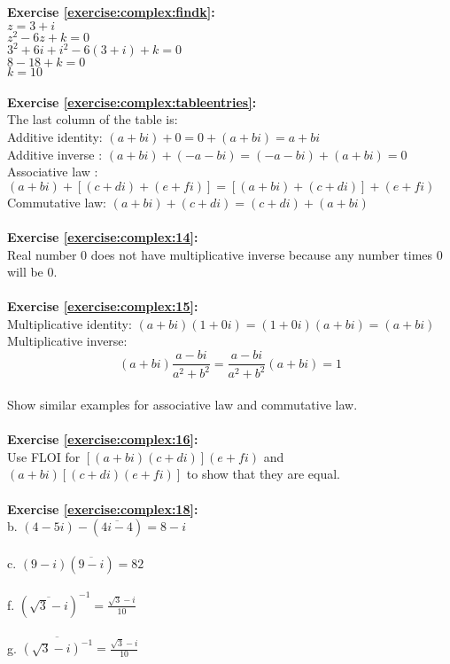 \noindent\textbf{Exercise \ref{exercise:complex:findk}:} \\
$z=3+i$\\
$z^{2}-6z+k=0$\\
$3^{2}+6i+i^{2}-6(3+i)+k=0$\\
$8-18+k=0$\\
$k=10$\\
\\
\textbf{Exercise \ref{exercise:complex:tableentries}:}\\
The last column of the table is:\\
Additive identity: $(a+bi)+0=0+(a+bi)=a+bi$\\
Additive inverse : $(a+bi)+(-a-bi)=(-a-bi)+(a+bi)=0$\\
Associative law  : $(a+bi)+[(c+di)+(e+fi)]=[(a+bi)+(c+di)]+(e+fi)$\\
Commutative law: $(a+bi)+(c+di)=(c+di)+(a+bi)$\\
\\
\textbf{Exercise \ref{exercise:complex:14}:}\\
Real number 0 does not have multiplicative inverse because any number times 0 will be 0.\\
\\
\textbf{Exercise \ref{exercise:complex:15}:}\\
Multiplicative identity: $(a+bi)(1+0i)=(1+0i)(a+bi)=(a+bi)$\\
Multiplicative inverse: $$(a+bi)\frac{a-bi}{a^{2}+b^{2}}= \frac{a-bi}{a^{2}+b^{2}}(a+bi)=1$$\\
Show similar examples for associative law and commutative law.\\
\\
\textbf{Exercise \ref{exercise:complex:16}:}\\
Use FLOI for $[(a+bi)(c+di)](e+fi)$ and $(a+bi)[(c+di)(e+fi)]$ to show that they are equal.\\
\\
\textbf{Exercise \ref{exercise:complex:18}:}\\
b. $ (4-5i)-(\overline{4i-4})=8-i$\\
\\
c. $(9-i)(\overline{9-i})=82$\\
\\
f. $(\overline{\sqrt{3}-i})^{-1}=\displaystyle\frac{\sqrt{3}-i}{10}$\\
\\
g. $\overline{(\sqrt{3}-i)^{-1}}=\displaystyle\frac{\sqrt{3}-i}{10}$\newline
